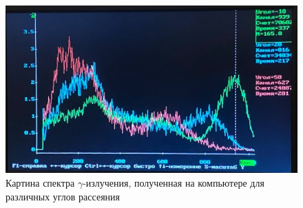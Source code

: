 \documentclass[a4paper,12pt]{article}
\begin{document}
\begin{figure}[h!]
	\centering
	\includegraphics[width=0.8\linewidth]{spectre_2}
	\caption{Картина спектра $\gamma$-излучения, полученная на компьютере для различных углов рассеяния}
\end{figure}
\end{document}
